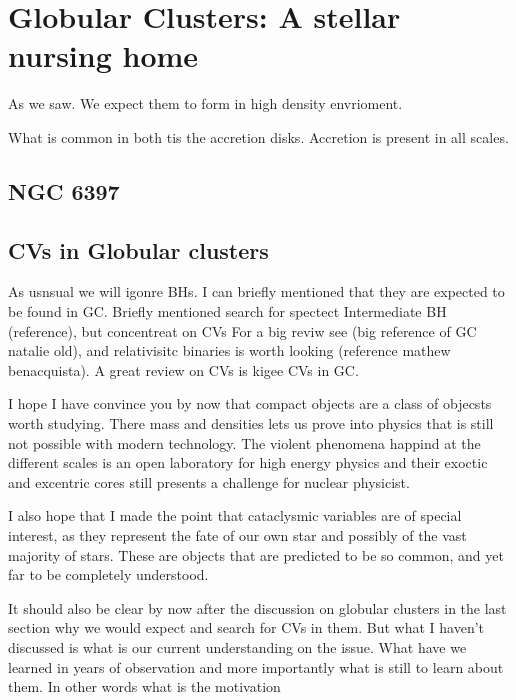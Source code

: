 \section{Globular Clusters: A stellar nursing home}\label{sec:gc}

As we saw. We expect them to form in high density envrioment. 


What is common in both tis the accretion disks. Accretion is present in all scales. 




\subsection{NGC 6397}



\subsection{CVs in Globular clusters}\label{sec:cogc}


As usnsual we will igonre BHs. I can briefly mentioned that they are expected to be found in GC. Briefly mentioned search for spectect Intermediate BH (reference), but concentreat on CVs
For a big reviw see (big reference of GC natalie old), and relativisitc binaries is worth looking (reference mathew benacquista). A great review on CVs is kigee CVs in GC. 


I hope I have convince you by now that compact objects are a class of objecsts worth studying. There mass and densities lets us prove into physics that is still not possible with modern technology. The violent phenomena happind at the different scales is an open laboratory for high energy physics and their exoctic and excentric cores still presents a challenge for nuclear physicist. 

I also hope that I made the point that cataclysmic variables are of special interest, as they represent the fate of our own star and possibly of the vast majority of stars. These are objects that are predicted to be so common, and yet far to be completely understood. 

It should also be clear by now after the discussion on globular clusters in the last section why we would expect and search for CVs in them. But what I haven't discussed is what is our current understanding on the issue. What have we learned in years of observation and more importantly what is still to learn about them. In other words what is the motivation



